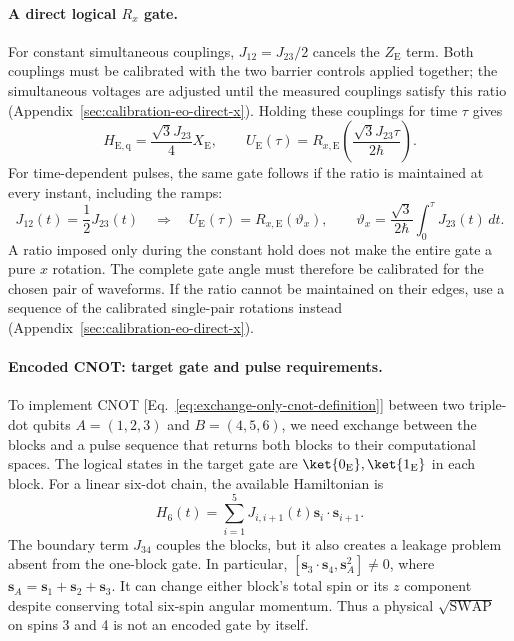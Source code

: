 \paragraph{A direct logical \texorpdfstring{$R_x$}{Rx} gate.}
For constant simultaneous couplings, $J_{12}=J_{23}/2$ cancels the
$Z_{\mathrm E}$ term. Both couplings must be calibrated with the
two barrier controls applied together; the simultaneous voltages
are adjusted until the measured couplings satisfy this ratio
(Appendix~\ref{sec:calibration-eo-direct-x}). Holding these couplings
for time $\tau$ gives
\begin{equation}
 H_{\mathrm{E,q}}=\frac{\sqrt3 J_{23}}{4}X_{\mathrm E},\qquad
 U_{\mathrm E}(\tau)
    =R_{x,\mathrm E}\!\left(\frac{\sqrt3 J_{23}\tau}{2\hbar}\right).
 \label{eq:exchange-only-direct-x-gate}
\end{equation}
For time-dependent pulses, the same gate follows if the ratio is
maintained at every instant, including the ramps:
\begin{equation}
 J_{12}(t)=\frac12J_{23}(t)
 \quad\Longrightarrow\quad
 U_{\mathrm E}(\tau)=R_{x,\mathrm E}(\vartheta_x),\qquad
 \vartheta_x=\frac{\sqrt3}{2\hbar}\int_0^\tau J_{23}(t)\,dt.
 \label{eq:exchange-only-shaped-x-gate}
\end{equation}
A ratio imposed only during the constant hold does not make the
entire gate a pure $x$ rotation. The complete gate angle must
therefore be calibrated for the chosen pair of waveforms. If the
ratio cannot be maintained on their edges, use a sequence of the
calibrated single-pair rotations instead
(Appendix~\ref{sec:calibration-eo-direct-x}).

\paragraph{Encoded CNOT: target gate and pulse requirements.}
To implement CNOT [Eq.~\eqref{eq:exchange-only-cnot-definition}]
between two triple-dot qubits $A=(1,2,3)$ and $B=(4,5,6)$, we need
exchange between the blocks and a pulse sequence that returns both
blocks to their computational spaces. The logical states in the
target gate are $\ket{0_{\mathrm E}},\ket{1_{\mathrm E}}$ in each block.
For a linear six-dot chain, the available Hamiltonian is
\begin{equation}
 H_6(t)=\sum_{i=1}^{5}J_{i,i+1}(t)
                 \mathbf{s}_i\cdot\mathbf{s}_{i+1}.
 \label{eq:six-spin-exchange}
\end{equation}
The boundary term $J_{34}$ couples the blocks, but it also creates
a leakage problem absent from the one-block gate.
In particular,
$[\mathbf{s}_3\cdot\mathbf{s}_4,\mathbf{s}_A^2]\ne0$, where
$\mathbf{s}_A=\mathbf{s}_1+\mathbf{s}_2+\mathbf{s}_3$.
It can change either block's total spin or its $z$ component despite
conserving total six-spin angular momentum.
Thus a physical $\sqrt{\mathrm{SWAP}}$ on spins 3 and 4 is not an
encoded gate by itself.

